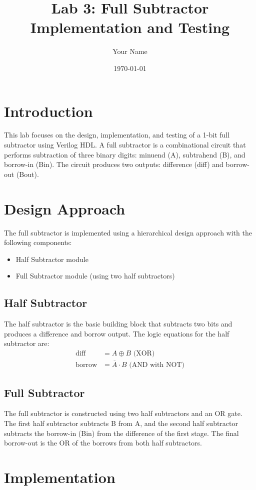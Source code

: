 \documentclass[12pt]{article}
\title{Lab 3: Full Subtractor Implementation and Testing}
\author{Your Name}
\date{\today}
\begin{document}
\maketitle

\section{Introduction}
This lab focuses on the design, implementation, and testing of a 1-bit full subtractor using Verilog HDL. A full subtractor is a combinational circuit that performs subtraction of three binary digits: minuend (A), subtrahend (B), and borrow-in (Bin). The circuit produces two outputs: difference (diff) and borrow-out (Bout).

\section{Design Approach}
The full subtractor is implemented using a hierarchical design approach with the following components:
\begin{itemize}
    \item Half Subtractor module
    \item Full Subtractor module (using two half subtractors)
\end{itemize}

\subsection{Half Subtractor}
The half subtractor is the basic building block that subtracts two bits and produces a difference and borrow output. The logic equations for the half subtractor are:
\begin{align*}
    \text{diff} &= A \oplus B \text{ (XOR)} \\
    \text{borrow} &= \overline{A} \cdot B \text{ (AND with NOT)}
\end{align*}

\subsection{Full Subtractor}
The full subtractor is constructed using two half subtractors and an OR gate. The first half subtractor subtracts B from A, and the second half subtractor subtracts the borrow-in (Bin) from the difference of the first stage. The final borrow-out is the OR of the borrows from both half subtractors.

\section{Implementation}
\end{document}

